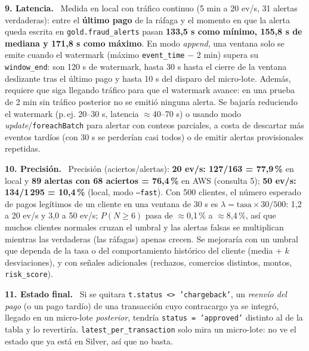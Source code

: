 \documentclass[10pt,a4paper]{article}
\newcommand{\q}[1]{\par\smallskip\textbf{#1}\ }
\newcommand{\code}[1]{\texttt{\small #1}}
\begin{document}
\q{9. Latencia.} Medida en local con tráfico continuo (5 min a 20 ev/s, 31 alertas verdaderas): entre el \textbf{último pago} de la ráfaga y el momento en que la alerta queda escrita en \code{gold.fraud\_alerts} pasan \textbf{133,5 s como mínimo, 155,8 s de mediana y 171,8 s como máximo}. En modo \emph{append}, una ventana solo se emite cuando el watermark (máximo \code{event\_time} $-$ 2 min) supera su \code{window\_end}: son 120 s de watermark, hasta 30 s hasta el cierre de la ventana deslizante tras el último pago y hasta 10 s del disparo del micro-lote. Además, requiere que siga llegando tráfico para que el watermark avance: en una prueba de 2 min sin tráfico posterior no se emitió ninguna alerta. Se bajaría reduciendo el watermark (p.\,ej. 20--30 s, latencia $\approx$40--70 s) o usando modo \emph{update}/\code{foreachBatch} para alertar con conteos parciales, a costa de descartar más eventos tardíos (con 30 s se perderían casi todos) o de emitir alertas provisionales repetidas.

\q{10. Precisión.} Precisión (aciertos/alertas): \textbf{20 ev/s: 127/163 = 77,9\,\%} en local y \textbf{89 alertas con 68 aciertos = 76,4\,\%} en AWS (consulta 5); \textbf{50 ev/s: 134/1\,295 = 10,4\,\%} (local, modo \code{--fast}). Con 500 clientes, el número esperado de pagos legítimos de un cliente en una ventana de 30 s es $\lambda=\text{tasa}\times30/500$: 1,2 a 20 ev/s y 3,0 a 50 ev/s; $P(N\ge6)$ pasa de $\approx$0,1\,\% a $\approx$8,4\,\%, así que muchos clientes normales cruzan el umbral y las alertas falsas se multiplican mientras las verdaderas (las ráfagas) apenas crecen. Se mejoraría con un umbral que dependa de la tasa o del comportamiento histórico del cliente (media + $k$ desviaciones), y con señales adicionales (rechazos, comercios distintos, montos, \code{risk\_score}).

\q{11. Estado final.} Si se quitara \code{t.status <> 'chargeback'}, un \emph{reenvío del pago} (o un pago tardío) de una transacción cuyo contracargo ya se integró, llegado en un micro-lote \emph{posterior}, tendría \code{status = 'approved'} distinto al de la tabla y lo revertiría. \code{latest\_per\_transaction} solo mira un micro-lote: no ve el estado que ya está en Silver, así que no basta.
\end{document}
